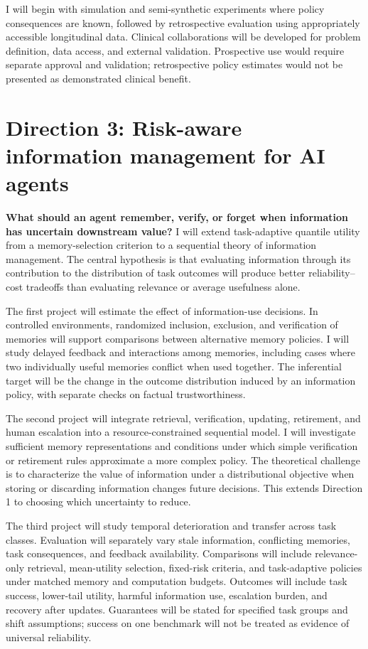 \documentclass[11pt,letterpaper]{article}
\begin{document}
I will begin with simulation and semi-synthetic experiments where policy
consequences are known, followed by retrospective evaluation using
appropriately accessible longitudinal data. Clinical collaborations will
be developed for problem definition, data access, and external validation.
Prospective use would require separate approval and validation;
retrospective policy estimates would not be presented as demonstrated
clinical benefit.

\section{Direction 3: Risk-aware information management for AI agents}

\textbf{What should an agent remember, verify, or forget when information
has uncertain downstream value?} I will extend task-adaptive quantile
utility from a memory-selection criterion to a sequential theory of
information management. The central hypothesis is that evaluating
information through its contribution to the distribution of task outcomes
will produce better reliability--cost tradeoffs than evaluating relevance
or average usefulness alone.

The first project will estimate the effect of information-use decisions.
In controlled environments, randomized inclusion, exclusion, and
verification of memories will support comparisons between alternative
memory policies. I will study delayed feedback and interactions among
memories, including cases where two individually useful memories conflict
when used together. The inferential target will be the change in the
outcome distribution induced by an information policy, with separate
checks on factual trustworthiness.

The second project will integrate retrieval, verification, updating,
retirement, and human escalation into a resource-constrained sequential
model. I will investigate sufficient memory representations and conditions
under which simple verification or retirement rules approximate a more
complex policy. The theoretical challenge is to characterize the value
of information under a distributional objective when storing or discarding
information changes future decisions. This extends Direction 1 to
choosing which uncertainty to reduce.

The third project will study temporal deterioration and transfer across
task classes. Evaluation will separately vary stale information,
conflicting memories, task consequences, and feedback availability.
Comparisons will include relevance-only retrieval, mean-utility selection,
fixed-risk criteria, and task-adaptive policies under matched memory and
computation budgets. Outcomes will include task success, lower-tail
utility, harmful information use, escalation burden, and recovery after
updates. Guarantees will be stated for specified task groups and shift
assumptions; success on one benchmark will not be treated as evidence of
universal reliability.
\end{document}
